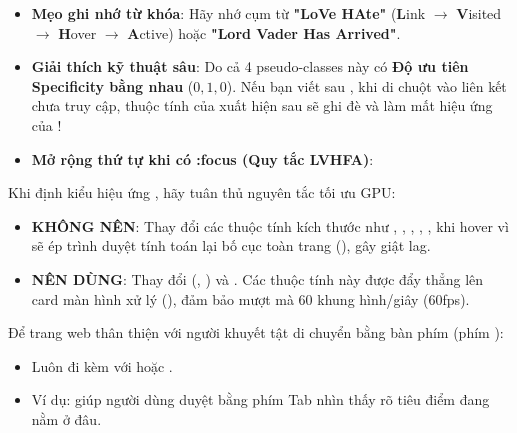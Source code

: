 \begin{tipBox}
\begin{itemize}[leftmargin=1.5em, itemsep=3pt, parsep=0pt]
    \item \textbf{Mẹo ghi nhớ từ khóa}: Hãy nhớ cụm từ \textbf{"LoVe HAte"} (\textbf{L}ink $\rightarrow$ \textbf{V}isited $\rightarrow$ \textbf{H}over $\rightarrow$ \textbf{A}ctive) hoặc \textbf{"Lord Vader Has Arrived"}.
    \item \textbf{Giải thích kỹ thuật sâu}: Do cả 4 pseudo-classes này có \textbf{Độ ưu tiên Specificity bằng nhau} ($0,1,0$). Nếu bạn viết  sau , khi di chuột vào liên kết chưa truy cập, thuộc tính của  xuất hiện sau sẽ ghi đè và làm mất hiệu ứng của !
    \item \textbf{Mở rộng thứ tự khi có :focus (Quy tắc LVHFA)}:
    \par\vspace{3pt}
\end{itemize}
\end{tipBox}

\begin{warnBox}
Khi định kiểu hiệu ứng , hãy tuân thủ nguyên tắc tối ưu GPU:
\begin{itemize}[leftmargin=1.5em, itemsep=2pt, parsep=0pt]
    \item \textbf{KHÔNG NÊN}: Thay đổi các thuộc tính kích thước như , , , , ,  khi hover vì sẽ ép trình duyệt tính toán lại bố cục toàn trang (), gây giật lag.
    \item \textbf{NÊN DÙNG}: Thay đổi  (, ) và . Các thuộc tính này được đẩy thẳng lên card màn hình xử lý (), đảm bảo mượt mà 60 khung hình/giây (60fps).
\end{itemize}
\end{warnBox}

\begin{tipBox}
Để trang web thân thiện với người khuyết tật di chuyển bằng bàn phím (phím ):
\begin{itemize}[leftmargin=1.5em, itemsep=2pt, parsep=0pt]
    \item Luôn đi kèm  với  hoặc .
    \item Ví dụ:  giúp người dùng duyệt bằng phím Tab nhìn thấy rõ tiêu điểm đang nằm ở đâu.
\end{itemize}
\end{tipBox}

